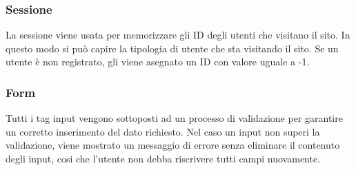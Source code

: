 \subsubsection{Sessione}
La sessione viene usata per memorizzare gli ID degli utenti che visitano il sito. In questo modo si può capire la tipologia di utente che sta visitando il sito. Se un utente è non registrato, gli viene asegnato un ID con valore uguale a -1.

\subsubsection{Form} Tutti i tag input vengono sottoposti ad un processo di validazione per garantire un corretto inserimento del dato richiesto. Nel caso un input non superi la validazione, viene mostrato un messaggio di errore senza eliminare il contenuto degli input, cosi che l'utente non debba riscrivere tutti campi nuovamente.